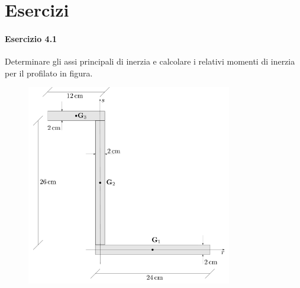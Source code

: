 \section{Esercizi}
\paragraph{Esercizio 4.1}
Determinare gli assi principali di inerzia e calcolare i relativi momenti di inerzia per il profilato in figura.
\renewcommand{\thefigure}{4.1~-~1}
\begin{figure}[ht]
\centering
\includegraphics[width=0.8\textwidth]{Immagini/Parte_4/Esercizio4_1/Esercizio4_1_1.pdf}
\caption{}
\label{Esercizio4-1-1}
\end{figure}


